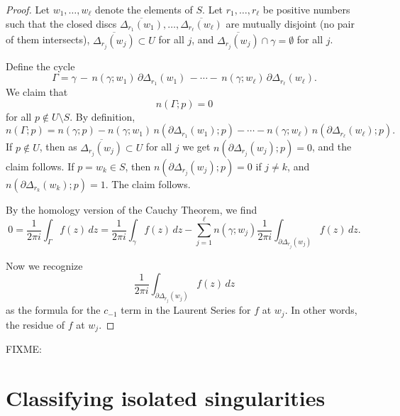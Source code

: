 \documentclass[12pt,openany]{book}
\theoremstyle{plain}
\theoremstyle{remark}
\theoremstyle{definition}
\theoremstyle{exercise}
\theoremstyle{example}
\begin{document}
\begin{proof}
Let $w_1,\ldots,w_\ell$ denote the elements of $S$.
Let $r_1,\ldots,r_\ell$ be positive numbers such that
the closed discs
$\overline{\Delta_{r_1}(w_1)},\ldots, \overline{\Delta_{r_\ell}(w_\ell)}$
are mutually disjoint (no pair of them intersects),
$\overline{\Delta_{r_j}(w_j)} \subset U$ for all $j$, and
$\overline{\Delta_{r_j}(w_j)} \cap \gamma = \emptyset$ for all $j$.

Define the cycle
\begin{equation*}
\Gamma = \gamma \,
- \, n(\gamma;w_1) \, \partial \Delta_{r_1} (w_1)
\, -
\cdots
- \, n(\gamma;w_\ell) \, \partial \Delta_{r_\ell} (w_\ell) .
\end{equation*}
We claim that
\begin{equation*}
n(\Gamma;p) = 0
\end{equation*}
for all $p \notin U \setminus S$.
By definition,
\begin{equation*}
n(\Gamma;p) = n(\gamma;p)
- n(\gamma;w_1) \, n(\partial \Delta_{r_1} (w_1) ; p)
-
\cdots
- n(\gamma;w_\ell) \, n(\partial \Delta_{r_\ell} (w_\ell) ; p) .
\end{equation*}
If $p \notin U$, then as 
$\overline{\Delta_{r_j}(w_j)} \subset U$ for all $j$ we get
$n( \partial \Delta_{r_j}(w_j) ; p) = 0$, and the claim follows.
If $p = w_k \in S$, then 
$n( \partial \Delta_{r_j}(w_j) ; p) = 0$ if $j \not= k$,
and
$n( \partial \Delta_{r_k}(w_k) ; p) = 1$.  The claim follows.

By the homology version of the Cauchy Theorem, we find
\begin{equation*}
0 = 
\frac{1}{2 \pi i}
\int_\Gamma f(z) \, dz
=
\frac{1}{2 \pi i}
\int_\gamma f(z) \, dz
-
\sum_{j=1}^\ell
n(\gamma;w_j)
\frac{1}{2 \pi i}
\int_{\partial \Delta_{r_j}(w_j)} f(z) \, dz .
\end{equation*}

Now we recognize
\begin{equation*}
\frac{1}{2 \pi i}
\int_{\partial \Delta_{r_j}(w_j)} f(z) \, dz
\end{equation*}
as the formula for the $c_{-1}$ term in the Laurent Series
for $f$ at $w_j$.  In other words, the residue of $f$ at $w_j$.
\end{proof}

FIXME:


\section{Classifying isolated singularities}
\end{document}
